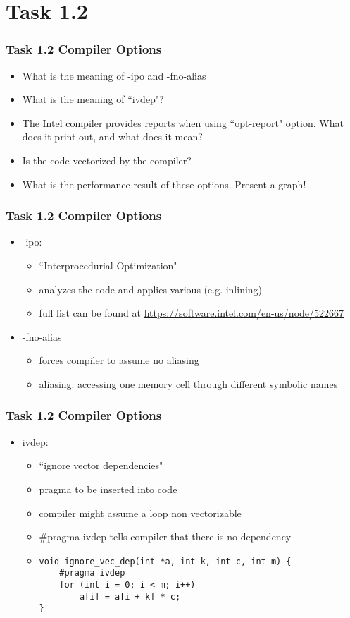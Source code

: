 \section{Task 1.2}
\begin{frame}
\frametitle{Task 1.2 Compiler Options}
\begin{itemize}
\item What is the meaning of -ipo and -fno-alias
\item What is the meaning of ``ivdep"?
\item The Intel compiler provides reports when using ``opt-report" option. What does it print out, and what does it mean?
\item Is the code vectorized by the compiler?
\item What is the performance result of these options. Present a graph!
\end{itemize}
\end{frame}

\begin{frame}
\frametitle{Task 1.2 Compiler Options}
\begin{itemize}
\item -ipo: 
\begin {itemize}
\item ``Interprocedurial Optimization" 
\item analyzes the code and applies various (e.g. inlining)
\item full list can be found at \url{https://software.intel.com/en-us/node/522667}
\end{itemize}
\item -fno-alias
\begin{itemize}
\item forces compiler to assume no aliasing
\item aliasing: accessing one memory cell through different symbolic names
\end{itemize}
\end{itemize}
\end{frame}

\begin{frame}[fragile]
\frametitle{Task 1.2 Compiler Options}
\begin{itemize}
\item ivdep: 
\begin{itemize}
\item ``ignore vector dependencies"
\item pragma to be inserted into code
\item compiler might assume a loop non vectorizable
\item \#pragma ivdep tells compiler that there is no dependency
\item \begin{lstlisting}
void ignore_vec_dep(int *a, int k, int c, int m) { 
	#pragma ivdep
	for (int i = 0; i < m; i++)
		a[i] = a[i + k] * c;
}
\end{lstlisting}
\end{itemize}
\end{itemize}
\end{frame}


